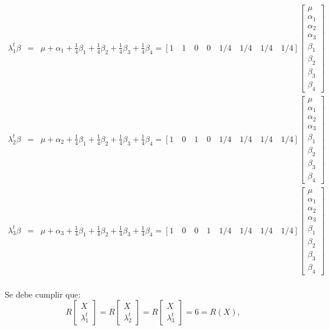 \documentclass[10pt,a4paper]{report}
\begin{document}
\begin{eqnarray*}
\lambda_1^t \beta 
&=& \mu + \alpha_1 + \frac{1}{4}\beta_1 + \frac{1}{4}\beta_2 + \frac{1}{4}\beta_3 + \frac{1}{4}\beta_4 =[1 \quad 1 \quad 0 \quad 0 \quad 1/4 \quad 1/4 \quad 1/4 \quad 1/4] 
\begin{bmatrix}
\mu \\ \alpha_1 \\ \alpha_2 \\ \alpha_3 \\ \beta_1 \\ \beta_2 \\ \beta_3 \\ \beta_4
\end{bmatrix}\\
\lambda_2^t \beta 
&=& \mu + \alpha_2 + \frac{1}{4}\beta_1 + \frac{1}{4}\beta_2 + \frac{1}{4}\beta_3 + \frac{1}{4}\beta_4 =[1 \quad 0 \quad 1 \quad 0 \quad 1/4 \quad 1/4 \quad 1/4 \quad 1/4] 
\begin{bmatrix}
\mu \\ \alpha_1 \\ \alpha_2 \\ \alpha_3 \\ \beta_1 \\ \beta_2 \\ \beta_3 \\ \beta_4
\end{bmatrix}\\
\lambda_3^t \beta 
&=& \mu + \alpha_3 + \frac{1}{4}\beta_1 + \frac{1}{4}\beta_2 + \frac{1}{4}\beta_3 + \frac{1}{4}\beta_4 =[1 \quad 0 \quad 0 \quad 1 \quad 1/4 \quad 1/4 \quad 1/4 \quad 1/4] 
\begin{bmatrix}
\mu \\ \alpha_1 \\ \alpha_2 \\ \alpha_3 \\ \beta_1 \\ \beta_2 \\ \beta_3 \\ \beta_4
\end{bmatrix}\\
\end{eqnarray*}

Se debe cumplir que:\\
\[R\begin{bmatrix} X \\ \lambda_1^t
\end{bmatrix} = R\begin{bmatrix} X \\ \lambda_2^t
\end{bmatrix} = R\begin{bmatrix} X \\ \lambda_3^t
\end{bmatrix} = 6 = R(X),\]
\end{document}
